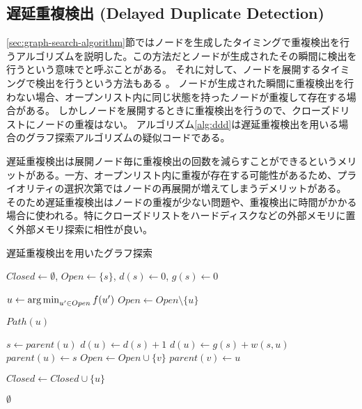 \subsection{遅延重複検出 (Delayed Duplicate Detection)}
\label{sec:delayed-duplicate-detection}

\ref{sec:graph-search-algorithm}節ではノードを生成したタイミングで重複検出を行うアルゴリズムを説明した。この方法だとノードが生成されたその瞬間に検出を行うという意味でと呼ぶことがある。
それに対して、ノードを展開するタイミングで検出を行うという方法もある \cite{korf2003delayed}。
ノードが生成された瞬間に重複検出を行わない場合、オープンリスト内に同じ状態を持ったノードが重複して存在する場合がある。
しかしノードを展開するときに重複検出を行うので、クローズドリストにノードの重複はない。
アルゴリズム\ref{alg:ddd}は遅延重複検出を用いる場合のグラフ探索アルゴリズムの疑似コードである。

遅延重複検出は展開ノード毎に重複検出の回数を減らすことができるというメリットがある。一方、オープンリスト内に重複が存在する可能性があるため、プライオリティの選択次第ではノードの再展開が増えてしまうデメリットがある。
そのため遅延重複検出はノードの重複が少ない問題や、重複検出に時間がかかる場合に使われる。特にクローズドリストをハードディスクなどの外部メモリに置く外部メモリ探索に相性が良い。


\begin{algorithm}
\caption{遅延重複検出を用いたグラフ探索}
\label{alg:ddd}
	$Closed \leftarrow \emptyset$, $Open \leftarrow \{s\}$, $d(s) \leftarrow 0$, $g(s) \leftarrow 0$\;
	 {
                $u \leftarrow \operatorname*{arg\,min}_{u' \in Open} f(u')$ \;
	        $Open \leftarrow Open \setminus \{u\} $\;
          
		 {
			\Return $Path(u)$\;
		}

                $s \leftarrow parent(u)$\;
		 {
                  $d(u) \leftarrow d(s) + 1$\;
                  $d(u) \leftarrow g(s) + w(s, u)$\;
		  $parent(u) \leftarrow s$\;
		   {
		    $Open \leftarrow Open \cup \{v\}$\;
		    $parent(v) \leftarrow u$\;
		  }
		}

                 {
                  $Closed \leftarrow Closed \cup \{u\}$\;
                }
 	}
	\Return $\emptyset$\;
\end{algorithm}



